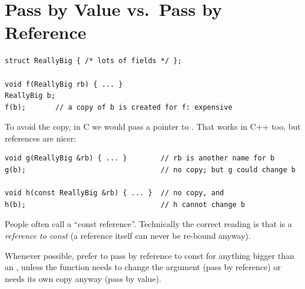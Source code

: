 \section{Pass by Value vs.\ Pass by Reference}
\begin{lstlisting}[style=cpp]
struct ReallyBig { /* lots of fields */ };

void f(ReallyBig rb) { ... }
ReallyBig b;
f(b);       // a copy of b is created for f: expensive
\end{lstlisting}
To avoid the copy, in C we would pass a pointer to . That works in C++
too, but references are nicer:
\begin{lstlisting}[style=cpp]
void g(ReallyBig &rb) { ... }        // rb is another name for b
g(b);                                // no copy; but g could change b

void h(const ReallyBig &rb) { ... }  // no copy, and
h(b);                                // h cannot change b
\end{lstlisting}
\begin{center}
\end{center}
People often call  a ``const reference''. Technically the correct
reading is that  is a \emph{reference to const} (a reference itself can
never be re-bound anyway).

\begin{important}[Advice]
Whenever possible, prefer to pass by reference to const for anything bigger
than an , unless the function needs to change the argument (pass by
reference) or needs its own copy anyway (pass by value).
\end{important}

